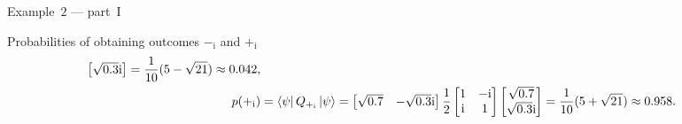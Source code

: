 \begin{frame}{Example~$2$ --- part~I}
\begin{block}{Probabilities of obtaining outcomes $-_\mathrm{i}$ and 
                $+_\mathrm{i}$}
\begin{equation*}
\begin{split}
\begin{bmatrix}
                            \sqrt{0.3}\mathrm{i}
                        \end{bmatrix}
                        = \frac{1}{10} (5-\sqrt{21})
                        \approx 0.042,  \\
                        p(+_\mathrm{i}) &= \bra{\psi} Q_{+_\mathrm{i}} \ket{\psi} = 
                        \begin{bmatrix}
                            \sqrt{0.7} & -\sqrt{0.3}\mathrm{i}
                        \end{bmatrix}
                        \frac{1}{2}
                        \begin{bmatrix}
                            1 & -\mathrm{i}\\
                            \mathrm{i} & 1
                        \end{bmatrix}
                        \begin{bmatrix}
                            \sqrt{0.7} \\
                            \sqrt{0.3}\mathrm{i}
                        \end{bmatrix}
                        = \frac{1}{10} (5+\sqrt{21})
                        \approx 0.958.
                    \end{split}
                \end{equation*}
            \end{block}
        \end{frame}
